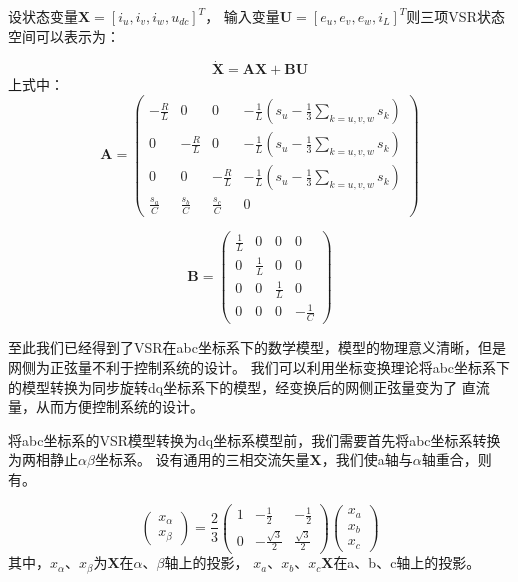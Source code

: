 设状态变量$\boldsymbol{X}=[i_{u},i_{v},i_{w},u_{dc}]^{T}$，
输入变量$\boldsymbol{U}=[e_{u},e_{v},e_{w},i_{L}]^{T}$则三项VSR状态空间可以表示为：

\begin{equation}
	\boldsymbol{\dot{X}}=\boldsymbol{AX}+\boldsymbol{BU}
	\label{equ:VSR状态空间}
\end{equation}
上式中：
\begin{equation}
	\boldsymbol{A}=
	\begin{pmatrix}
		-\frac{R}{L}    & 0               & 0               & -\frac{1}{L}  ( s_{u}-\frac{1}{3} \sum\limits_{k=u,v,w} s_{k}  ) \\
		0               & -\frac{R}{L}    & 0               & -\frac{1}{L}  ( s_{u}-\frac{1}{3} \sum\limits_{k=u,v,w} s_{k}  ) \\
		0               & 0               & -\frac{R}{L}    & -\frac{1}{L}  ( s_{u}-\frac{1}{3} \sum\limits_{k=u,v,w} s_{k}  ) \\
		\frac{s_{a}}{C} & \frac{s_{b}}{C} & \frac{s_{c}}{C} & 0
	\end{pmatrix}
\end{equation}

\begin{equation}
	\boldsymbol{B}=
	\begin{pmatrix}
		\frac{1}{L} & 0           & 0           & 0            \\
		0           & \frac{1}{L} & 0           & 0            \\
		0           & 0           & \frac{1}{L} & 0            \\
		0           & 0           & 0           & -\frac{1}{C}
	\end{pmatrix}
\end{equation}

至此我们已经得到了VSR在abc坐标系下的数学模型，模型的物理意义清晰，但是网侧为正弦量不利于控制系统的设计。
我们可以利用坐标变换理论将abc坐标系下的模型转换为同步旋转dq坐标系下的模型，经变换后的网侧正弦量变为了
直流量，从而方便控制系统的设计。

将abc坐标系的VSR模型转换为dq坐标系模型前，我们需要首先将abc坐标系转换为两相静止$\alpha\beta$坐标系。
设有通用的三相交流矢量$\boldsymbol{X}$，我们使a轴与$\alpha$轴重合，则有。

\begin{equation}
	\begin{pmatrix}
		x_{\alpha } \\
		x_{\beta }
	\end{pmatrix}
	=
	\frac{2}{3}
	\begin{pmatrix}
		1 & -\frac{1}{2}         & -\frac{1}{2}        \\
		0 & -\frac{\sqrt{3} }{2} & \frac{\sqrt{3} }{2}
	\end{pmatrix}
	\begin{pmatrix}
		x_{a} \\
		x_{b} \\
		x_{c}
	\end{pmatrix}
	\label{equ:abc2αβ}
\end{equation}
其中，$x_{\alpha}$、$x_{\beta}$为$\boldsymbol{X}$在$\alpha$、$\beta$轴上的投影，
$x_{a}$、$x_{b}$、$x_{c}$$\boldsymbol{X}$在a、b、c轴上的投影。

